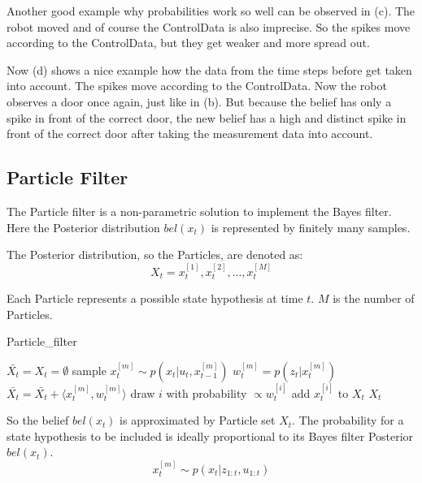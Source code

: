 Another good example why probabilities work so well can be observed in (c). The robot moved and of course the \gls{ControlData} is also imprecise. So the spikes move according to the \gls{ControlData}, but they get weaker and more spread out.

Now (d) shows a nice example how the data from the time steps before get taken into account. The spikes move according to the \gls{ControlData}. Now the robot observes a door once again, just like in (b). But because the belief has only a spike in front of the correct door, the new belief has a high and distinct spike in front of the correct door after taking the measurement data into account.
\subsection{Particle Filter}
The \gls{Particle} filter is a non-parametric solution to implement the Bayes filter.  Here the \gls{Posterior} distribution $bel(x_t)$ is represented by finitely many samples\citep[p. 85]{Thrun:2005:PR:1121596}.

The \gls{Posterior} distribution, so the \gls{Particle}s, are denoted as:
\begin{equation}
X_t = x_t^{[1]},x_t^{[2]},...,x_t^{[M]}
\end{equation}

Each \gls{Particle} represents a possible state hypothesis at time $t$. $M$ is the number of \gls{Particle}s\citep[p. 96-97]{Thrun:2005:PR:1121596}.

\begin{algorithm}
\caption{Particle\_filter \citep[p. 98]{Thrun:2005:PR:1121596}}
\label{particle_filter}
\begin{algorithmic}[1]
\State $\bar{X_t} = X_t = \emptyset$
\State sample $x_t^{[m]} \sim p(x_t|u_t,x_{t-1}^{[m]})$
\State $w_t^{[m]} = p(z_t|x_t^{[m]})$
\State $\bar{X_t} = \bar{X_t} + \langle x_t^{[m]},w_t^{[m]}\rangle$
\EndFor
{}
\State draw $i$ with probability $\propto w_t^{[i]}$
\State add $x_t^{[i]}$ to $X_t$
\EndFor
\State \Return $X_t$
\EndProcedure
\end{algorithmic}
\end{algorithm}

So the belief $bel(x_t)$ is approximated by \gls{Particle} set $X_t$. The probability for a state hypothesis to be included is ideally proportional to its Bayes filter \gls{Posterior} $bel(x_t)$\citep[p. 98]{Thrun:2005:PR:1121596}.
\begin{equation} \label{eq:particle_prob}
x_t^{[m]} \sim p(x_t|z_{1:t},u_{1:t})
\end{equation}

